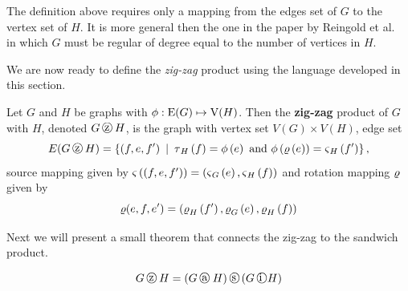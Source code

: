 The definition above requires only a mapping from the edges set of $G$ to the vertex set of $H$. It is more general then the one in the paper by Reingold {et al.}~\cite{Reingold:2002ys} in which $G$ must be regular of degree equal to the number of vertices in $H$.

We are now ready to define the {\em zig-zag} product using the language developed in this section.

 \begin{definition}
 \label{def:cat_zigzag}
Let $G$ and $H$ be graphs with $\phi:\mathrm{E}(G)  \mapsto \mathrm{V}(H)$. Then the {\bf zig-zag} product of $G$ with $H$, denoted $G \zigzag H$, is the graph with vertex set $V(G) \times V(H)$,  edge set
\[ E(G \zigzag H) = \left\{  \left( f, e, f^{\prime} \right) \ \vert \ \Term_H\left(f\right) = \phi\left(e\right)\ \textrm{and} \  \phi\left( \Rot\left(e \right)  \right) = \Source_{H}\left(f^{\prime}\right)  \right\}, \] source mapping given by $\operatorname{\mathbf{\varsigma}}\left( \left(f, e, f^{\prime}\right)\right) = \left( \operatorname{\mathbf{\varsigma}}_G \left(e \right), \operatorname{\mathbf{\varsigma}}_{H}\left( f \right) \right)$ and rotation mapping $\operatorname{\mathbf{\varrho}}$ given by  \[ \operatorname{\mathbf{\varrho}}(e,f,e^{\prime}) = \left( \operatorname{\mathbf{\varrho}}_{H}\left( f^{\prime} \right) , \operatorname{\mathbf{\varrho}}_{G} \left( e \right), \operatorname{\mathbf{\varrho}}_{H } \left( f \right) \right)  \]
\end{definition}

Next we will present a small theorem that connects the zig-zag to the sandwich product. 
\begin{theorem}
\[ G \zigzag H = \left( G \zag H \right) \sandwich \left( G \zig H \right)
                   \]
\label{thm:zigzagsandwich} 
\end{theorem}

